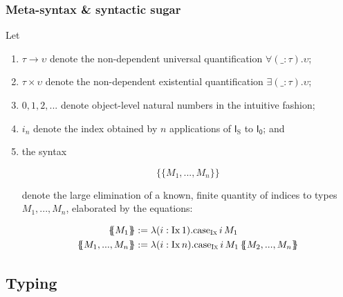 \documentclass[authoryear,acmsmall,screen]{acmart}
\newcommand\IX{\textsc{Ix}}
\newcommand\FZero{\mathsf{I_0}}
\newcommand\Suc{\mathrm{S}}
\newcommand\FSuc{\mathsf{I_{\Suc}}}
\newcommand\Ix[1]{\mathrm{Ix} \, #1}
\renewcommand\Case{\mathrm{case}}
\newcommand\CaseFZ[2]{\ensuremath{\Case_{\mathrm{\IX{}}} \, #1 \, #2 }}
\newcommand\CaseFS[3]{\ensuremath{\Case_{\mathrm{\IX{}}} \, #1 \, #2 \, #3 }}
\newcommand\Felim[1]{\{\!\!\{#1\}\!\!\}}
\begin{document}
\subsubsection{Meta-syntax \& syntactic sugar}

Let
\begin{enumerate}
\item $\tau \to \upsilon$ denote the non-dependent universal quantification $\forall (\_ : \tau). \upsilon$;
\item $\tau \times \upsilon$ denote the non-dependent existential quantification $\exists (\_ : \tau). \upsilon$;
\item $0,1,2,...$ denote object-level natural numbers in the intuitive fashion; \item $i_{n}$ denote the index obtained by $n$ applications of $\FSuc$ to $\FZero$; and
\item the syntax 

\[
\Felim {M_1,...,M_n}
\]

denote the large elimination of a known, finite quantity of indices to types $M_{1},...,M_{n}$, elaborated by the equations:

\begin{align*}
  \Felim{M_{1}} &:= \lambda (i : \Ix{1}). \CaseFZ i M_{1} \\
  \Felim{M_{1},...,M_{n}} &:= \lambda (i : \Ix{n}). \CaseFS i {M_{1}} \Felim{M_{2},...,M_{n}}
\end{align*}
\end{enumerate}



\subsection{Typing}
\end{document}
